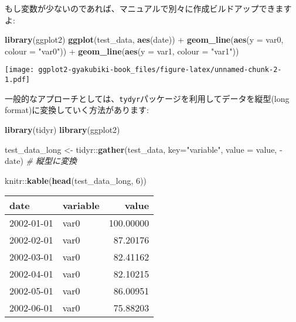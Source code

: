 \documentclass[]{book}
\newenvironment{Shaded}{\begin{snugshade}}{\end{snugshade}}
\newcommand{\KeywordTok}[1]{\textcolor[rgb]{0.13,0.29,0.53}{\textbf{{#1}}}}
\newcommand{\DataTypeTok}[1]{\textcolor[rgb]{0.13,0.29,0.53}{{#1}}}
\newcommand{\DecValTok}[1]{\textcolor[rgb]{0.00,0.00,0.81}{{#1}}}
\newcommand{\StringTok}[1]{\textcolor[rgb]{0.31,0.60,0.02}{{#1}}}
\newcommand{\CommentTok}[1]{\textcolor[rgb]{0.56,0.35,0.01}{\textit{{#1}}}}
\newcommand{\NormalTok}[1]{{#1}}
\begin{document}
もし変数が少ないのであれば、マニュアルで別々に作成ビルドアップできますよ:

\begin{Shaded}
\begin{Highlighting}[]
\KeywordTok{library}\NormalTok{(ggplot2)}
\KeywordTok{ggplot}\NormalTok{(test_data, }\KeywordTok{aes}\NormalTok{(date)) +}
\StringTok{  }\KeywordTok{geom_line}\NormalTok{(}\KeywordTok{aes}\NormalTok{(}\DataTypeTok{y =} \NormalTok{var0, }\DataTypeTok{colour =} \StringTok{"var0"}\NormalTok{)) +}
\StringTok{  }\KeywordTok{geom_line}\NormalTok{(}\KeywordTok{aes}\NormalTok{(}\DataTypeTok{y =} \NormalTok{var1, }\DataTypeTok{colour =} \StringTok{"var1"}\NormalTok{))}
\end{Highlighting}
\end{Shaded}

\texttt{[image: ggplot2-gyakubiki-book\_files/figure-latex/unnamed-chunk-2-1.pdf]}

一般的なアプローチとしては、\texttt{tydyr}パッケージを利用してデータを縦型(long
format)に変換していく方法があります:

\begin{Shaded}
\begin{Highlighting}[]
\KeywordTok{library}\NormalTok{(tidyr)}
\KeywordTok{library}\NormalTok{(ggplot2)}

\NormalTok{test_data_long <-}\StringTok{ }\NormalTok{tidyr::}\KeywordTok{gather}\NormalTok{(test_data, }\DataTypeTok{key=}\StringTok{"variable"}\NormalTok{, }\DataTypeTok{value =} \NormalTok{value, -date) }\CommentTok{# 縦型に変換}

\NormalTok{knitr::}\KeywordTok{kable}\NormalTok{(}\KeywordTok{head}\NormalTok{(test_data_long, }\DecValTok{6}\NormalTok{))}
\end{Highlighting}
\end{Shaded}

\begin{tabular}{l|l|r}
\hline
date & variable & value\\
\hline
2002-01-01 & var0 & 100.00000\\
\hline
2002-02-01 & var0 & 87.20176\\
\hline
2002-03-01 & var0 & 82.41162\\
\hline
2002-04-01 & var0 & 82.10215\\
\hline
2002-05-01 & var0 & 86.00951\\
\hline
2002-06-01 & var0 & 75.88203\\
\hline
\end{tabular}
\end{document}
